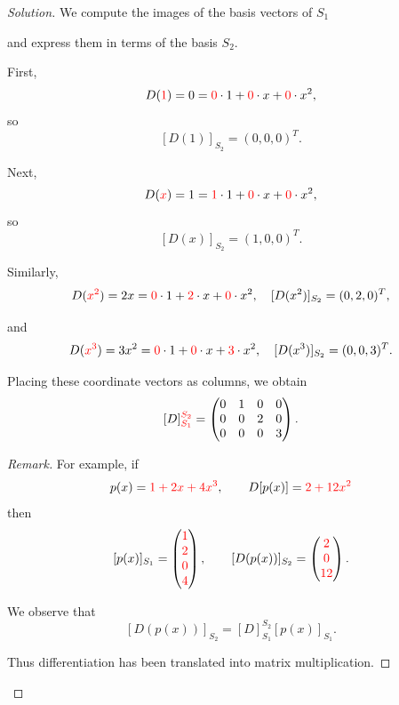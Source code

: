 \documentclass[12pt]{article}
\newenvironment{solution}
{\begin{proof}[Solution]}
{\end{proof}}
\newenvironment{Remark}
{\begin{proof}[Remark]}
{\end{proof}}
\begin{document}
\begin{solution}
We compute the images of the basis vectors of $S_1$ 

and express them in terms of the basis $S_2$.

\medskip

First,
\[
D(\textcolor{red}{1})=0=\textcolor{red}{0}\cdot1+\textcolor{red}{0}\cdot x+\textcolor{red}{0}\cdot x^2,
\]
so
\[
[D(1)]_{S_2}=(0,0,0)^T.
\]

Next,
\[
D(\textcolor{red}{x})=1=\textcolor{red}{1}\cdot1+\textcolor{red}{0}\cdot x+\textcolor{red}{0}\cdot x^2,
\]
so
\[
[D(x)]_{S_2}=(1,0,0)^T.
\]

Similarly,
\[
D(\textcolor{red}{x^2})=2x=\textcolor{red}{0}\cdot1+\textcolor{red}{2}\cdot x+\textcolor{red}{0}\cdot x^2,
\quad
[D(x^2)]_{S_2}=(0,2,0)^T,
\]

and
\[
D(\textcolor{red}{x^3})=3x^2=\textcolor{red}{0}\cdot1+\textcolor{red}{0}\cdot x+\textcolor{red}{3}\cdot x^2,
\quad
[D(x^3)]_{S_2}=(0,0,3)^T.
\]

\medskip

Placing these coordinate vectors as columns, we obtain
\[
[D]_{\textcolor{red}{S_1}}^{\textcolor{red}{S_2}}
=
\begin{pmatrix}
0 & 1 & 0 & 0\\
0 & 0 & 2 & 0\\
0 & 0 & 0 & 3
\end{pmatrix}.
\]

\begin{Remark}
For example, if
\[
p(x)=\textcolor{red}{1+2x+4x^3},\qquad D[p(x)]=\textcolor{red}{2 + 12x^2}
\]
then
\[
[p(x)]_{S_1}=
\begin{pmatrix}
\textcolor{red}{1}\\
\textcolor{red}{2}\\
\textcolor{red}{0}\\
\textcolor{red}{4}
\end{pmatrix},
\qquad
[D(p(x))]_{S_2}=
\begin{pmatrix}
\textcolor{red}{2}\\
\textcolor{red}{0}\\
\textcolor{red}{12}
\end{pmatrix}.
\]

We observe that
\[
[D(p(x))]_{S_2}=[D]_{S_1}^{S_2}[p(x)]_{S_1}.
\]

Thus differentiation has been translated into matrix multiplication.
\end{Remark}

\end{solution}
\end{document}

